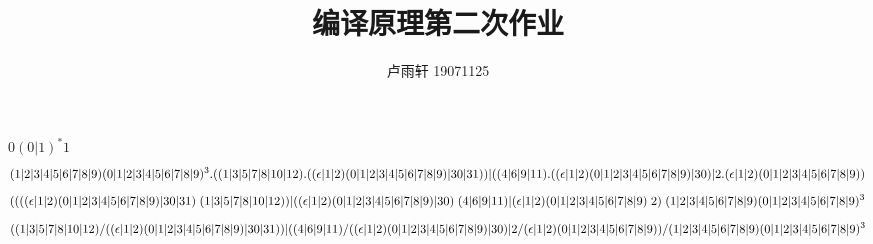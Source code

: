 \documentclass{ctexart}
\title{编译原理第二次作业}
\author{卢雨轩 19071125}
\begin{document}
\maketitle

\begin{outline}
    \1 [23.]
        \2[(8)] $0(0|1) ^*1$
    \1 [27.]
        \2[(1)] \begin{dmath*}
            (1|2|3|4|5|6|7|8|9) (0|1|2|3|4|5|6|7|8|9) ^3.((1|3|5|7|8|10|12) .((\epsilon|1|2) (0|1|2|3|4|5|6|7|8|9) |30|31) ) |((4|6|9|11) . \\ 
            ((\epsilon|1|2) (0|1|2|3|4|5|6|7|8|9) |30) |2.(\epsilon|1|2) (0|1|2|3|4|5|6|7|8|9) ) 
        \end{dmath*}
        \2[(2)] \begin{dmath*}
            (
            (
                ((\epsilon|1|2) (0|1|2|3|4|5|6|7|8|9) |30|31)\; (1|3|5|7|8|10|12)
            ) |
            ((\epsilon|1|2) (0|1|2|3|4|5|6|7|8|9) |30)\;(4|6|9|11) | \\(\epsilon|1|2) (0|1|2|3|4|5|6|7|8|9)\;2
            )\;(1|2|3|4|5|6|7|8|9) (0|1|2|3|4|5|6|7|8|9) ^3
        \end{dmath*}
        \2[(3)] \begin{dmath*}
            ((1|3|5|7|8|10|12)/((\epsilon|1|2) (0|1|2|3|4|5|6|7|8|9) |30|31) ) |((4|6|9|11) /\\ 
            ((\epsilon|1|2) (0|1|2|3|4|5|6|7|8|9) |30) |2/(\epsilon|1|2) (0|1|2|3|4|5|6|7|8|9) )/(1|2|3|4|5|6|7|8|9) (0|1|2|3|4|5|6|7|8|9) ^3
        \end{dmath*}
    \1 [31] \2[(2)]
\end{outline}
\end{document}
